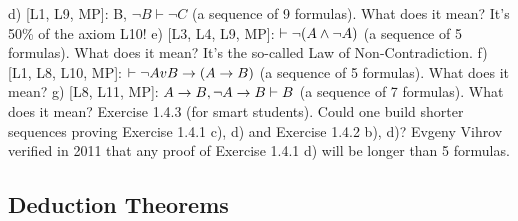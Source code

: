 d) [L1, L9, MP]: B, \(\neg B \vdash \neg C\) (a sequence of 9 formulas). What does it mean? It's 50\% of the axiom L10!
e) [L3, L4, L9, MP]: \(\vdash \neg (A\wedge \neg A)\) (a sequence of 5 formulas). What does it mean? It's the so-called Law of
Non-Contradiction.
f) [L1, L8, L10, MP]: \(\vdash \neg AvB\rightarrow (A\rightarrow B)\) (a sequence of 5 formulas). What does it mean?
g) [L8, L11, MP]: \(A\rightarrow B, \neg A\rightarrow B \vdash B\) (a sequence of 7 formulas). What does it mean?
Exercise 1.4.3 (for smart students). Could one build shorter sequences proving Exercise 1.4.1 c), d) and
Exercise 1.4.2 b), d)? Evgeny Vihrov verified in 2011 that any proof of Exercise 1.4.1 d) will be longer
than 5 formulas.

\subsection{Deduction Theorems}

